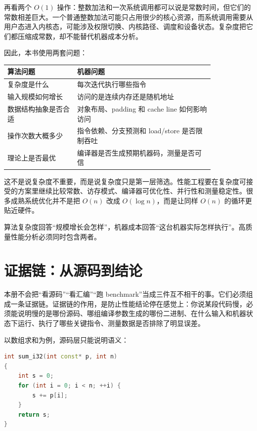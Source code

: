再看两个 $O(1)$ 操作：整数加法和一次系统调用都可以说是常数时间，但它们的常数相差巨大。一个普通整数加法可能只占用很少的核心资源，而系统调用需要从用户态进入内核态，可能涉及权限切换、内核路径、调度和设备状态。复杂度把它们都压缩成常数，却不能替代机器成本分析。

因此，本书使用两套问题：

\begin{center}
\begin{tabular}{p{0.28\linewidth}p{0.55\linewidth}}
\toprule
算法问题 & 机器问题 \\
\midrule
复杂度是什么 & 每次迭代执行哪些指令 \\
输入规模如何增长 & 访问的是连续内存还是随机地址 \\
数据结构抽象是否合适 & 对象布局、padding 和 cache line 如何影响访问 \\
操作次数大概多少 & 指令依赖、分支预测和 load/store 是否限制吞吐 \\
理论上是否最优 & 编译器是否生成预期机器码，测量是否可信 \\
\bottomrule
\end{tabular}
\end{center}

这不是说复杂度不重要，而是说复杂度只是第一层筛选。性能工程要在复杂度可接受的方案里继续比较常数、访存模式、编译器可优化性、并行性和测量稳定性。很多成熟系统优化并不是把 $O(n)$ 改成 $O(\log n)$，而是让同样 $O(n)$ 的循环更贴近硬件。

\begin{keyidea}
算法复杂度回答“规模增长会怎样”，机器成本回答“这台机器实际怎样执行”。高质量性能分析必须同时包含两者。
\end{keyidea}

\section{证据链：从源码到结论}

本册不会把“看源码”“看汇编”“跑 benchmark”当成三件互不相干的事。它们必须组成一条证据链。证据链的作用，是防止性能结论停在感觉上：你说某段代码慢，必须能说明慢的是哪份源码、哪组编译参数生成的哪份二进制、在什么输入和机器状态下运行、执行了哪些关键指令、测量数据是否排除了明显误差。

以数组求和为例，源码层只能说明语义：

\begin{lstlisting}[language=C++,caption={源码层语义}]
int sum_i32(int const* p, int n)
{
    int s = 0;
    for (int i = 0; i < n; ++i) {
        s += p[i];
    }
    return s;
}
\end{lstlisting}

